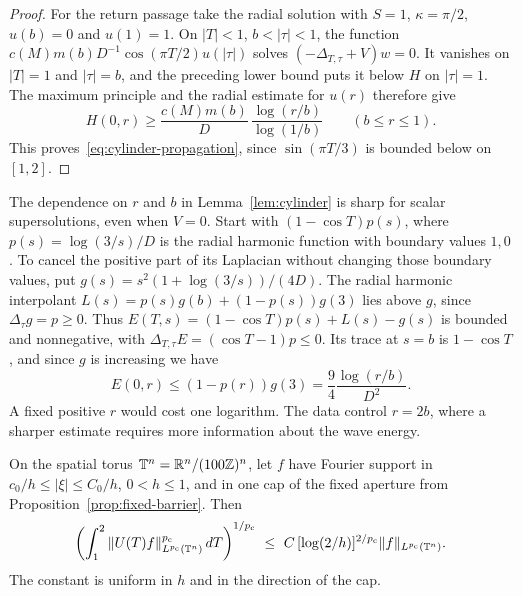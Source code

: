 \begin{proof}
For the return passage take the radial solution with $S=1$,
$\kappa=\pi/2$, $u(b)=0$ and $u(1)=1$. On $|T|<1$, $b<|\tau|<1$,
the function $c(M)m(b)D^{-1}\cos(\pi T/2)u(|\tau|)$ solves
$(-\Delta_{T,\tau}+V)w=0$. It vanishes on $|T|=1$ and $|\tau|=b$,
and the preceding lower bound puts it below $H$ on $|\tau|=1$.
The maximum principle and the radial estimate for $u(r)$ therefore give
\[
 H(0,r)\ge\frac{c(M)m(b)}D\,\frac{\log(r/b)}{\log(1/b)}
 \qquad(b\le r\le1).
\]
This proves~\eqref{eq:cylinder-propagation}, since $\sin(\pi T/3)$ is
bounded below on $[1,2]$.
\end{proof}

\begin{remark}\label{rem:cylinder-power}
The dependence on $r$ and $b$ in Lemma~\ref{lem:cylinder} is sharp
for scalar supersolutions, even when $V=0$. Start with
$(1-\cos T)p(s)$, where $p(s)=\log(3/s)/D$ is the radial harmonic
function with boundary values $1,0$. To cancel the positive part of
its Laplacian without changing those boundary values, put
$g(s)=s^2(1+\log(3/s))/(4D)$. The radial harmonic interpolant
$L(s)=p(s)g(b)+(1-p(s))g(3)$ lies above $g$, since $\Delta_\tau g=p\ge0$.
Thus $E(T,s)=(1-\cos T)p(s)+L(s)-g(s)$ is bounded and nonnegative,
with $\Delta_{T,\tau}E=(\cos T-1)p\le0$. Its trace at $s=b$ is
$1-\cos T$, and since $g$ is increasing we have
\[
 E(0,r)\le (1-p(r))g(3)=\frac94\frac{\log(r/b)}{D^2}.
\]
A fixed positive $r$ would cost one logarithm. The data control $r=2b$,
where a sharper estimate requires more information about the wave energy.
\end{remark}

\begin{proposition}\label{prop:periodic-cap}
On the spatial torus $\mathbb T^n=\mathbb R^n/(100\mathbb Z)^n$, let
$f$ have Fourier support in $c_0/h\le|\xi|\le C_0/h$, $0<h\le1$, and
in one cap of the fixed aperture from Proposition~\ref{prop:fixed-barrier}.
Then
\begin{equation}\label{eq:periodic-cap}
 \left(\int_1^2\|U(T)f\|_{L^{p_{\mathrm c}}(\mathbb T^n)}^{p_{\mathrm c}}\,dT\right)^{1/p_{\mathrm c}}
 \ \le\ C\,[\log(2/h)]^{2/p_{\mathrm c}}\|f\|_{L^{p_{\mathrm c}}(\mathbb T^n)} .
\end{equation}
The constant is uniform in $h$ and in the direction of the cap.
\end{proposition}

